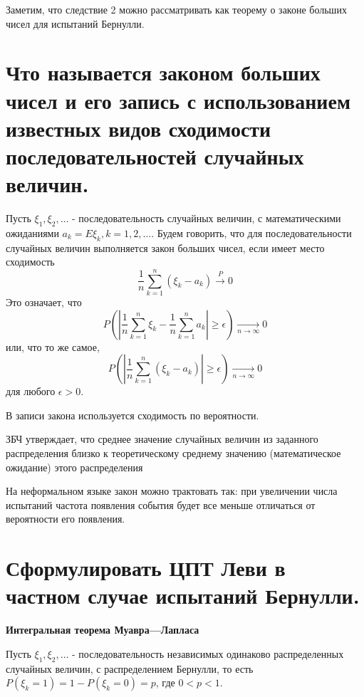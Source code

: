 Заметим, что следствие 2 можно рассматривать как теорему о законе больших чисел для испытаний Бернулли.

\section{Что называется законом больших чисел и его запись с использованием известных видов сходимости последовательностей случайных величин.}

Пусть $\xi_1, \xi_2, \dots$ - последовательность случайных величин, с математическими ожиданиями $a_k = E\xi_k, k = 1, 2, \dots$. Будем говорить, что для последовательности случайных величин выполняется закон больших чисел, если имеет место сходимость
\[ \frac{1}{n} \sum_{k=1}^{n} (\xi_k - a_k) \overset{P}{\to} 0 \]
Это означает, что
\[ P \left( \left| \frac{1}{n} \sum_{k=1}^{n} \xi_k - \frac{1}{n} \sum_{k=1}^{n} a_k \right| \ge \epsilon \right) \underset{n \to \infty}{\to} 0 \]
или, что то же самое,
\[ P \left( \left| \frac{1}{n} \sum_{k=1}^{n} (\xi_k - a_k) \right| \ge \epsilon \right) \underset{n \to \infty}{\to} 0 \]
для любого $\epsilon > 0$.

В записи закона используется сходимость по вероятности.

ЗБЧ утверждает, что среднее значение случайных величин из заданного распределения близко к теоретическому среднему значению (математическое ожидание) этого распределения

На неформальном языке закон можно трактовать так: при увеличении числа испытаний частота появления события будет все меньше отличаться от вероятности его появления.

\section{Сформулировать ЦПТ Леви в частном случае испытаний Бернулли.}

\noindent \textbf{Интегральная теорема Муавра—Лапласа}

Пусть $\xi_1, \xi_2, \dots$ - последовательность независимых одинаково распределенных случайных величин, с распределением Бернулли, то есть $P (\xi_k = 1) = 1 - P(\xi_k = 0) = p$, где $0 < p < 1$.

